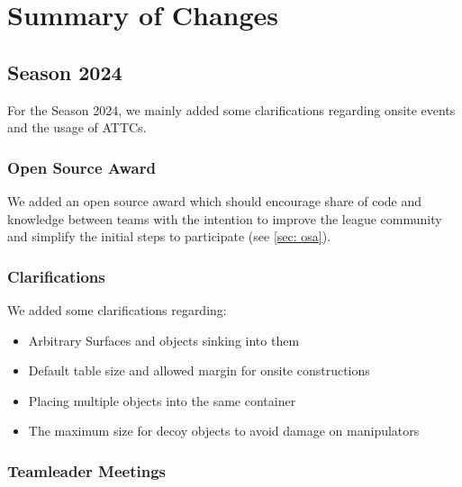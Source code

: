 
\chapter{Summary of Changes}

\begin{comment}
This chapter provides an overview for experienced teams that know the rules and just need an update on what is new for the specific year. 
All new teams are strongly advised to read the whole rule book thoroughly.
\end{comment}

\section{Season 2024}

For the Season 2024, we mainly added some clarifications regarding onsite events and the usage of ATTCs.

\subsection{Open Source Award}

We added an open source award which should encourage share of code and knowledge between teams with the intention to improve the league community and simplify the initial steps to participate (see \ref{sec: osa}).

\subsection{Clarifications}

We added some clarifications regarding:

\begin{itemize}
	\item Arbitrary Surfaces and objects sinking into them
	\item Default table size and allowed margin for onsite constructions
	\item Placing multiple objects into the same container
	\item The maximum size for decoy objects to avoid damage on manipulators
\end{itemize}

\subsection{Teamleader Meetings}

